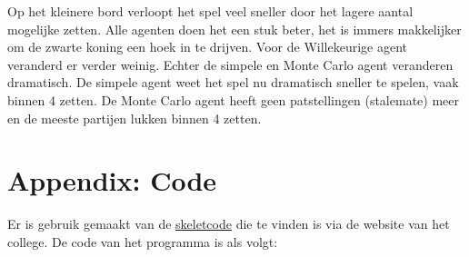 \documentclass[10pt]{article}
\begin{document}
Op het kleinere bord verloopt het spel veel sneller door het lagere aantal mogelijke zetten. Alle agenten doen het een stuk beter, het is immers makkelijker om de zwarte koning een hoek in te drijven. Voor de Willekeurige agent veranderd er verder weinig. Echter de simpele en Monte Carlo agent veranderen dramatisch. De simpele agent weet het spel nu dramatisch sneller te spelen, vaak binnen 4 zetten. De Monte Carlo agent heeft geen patstellingen (stalemate) meer en de meeste partijen lukken binnen 4 zetten.




\pagebreak
\section*{Appendix: Code}

Er is gebruik gemaakt van de \href{http://www.liacs.leidenuniv.nl/~kosterswa/AI/iets.cc}{\underline{skeletcode}} die te vinden is via
de website van het college.
De code van het programma is als volgt:

\smallskip


\end{document}
